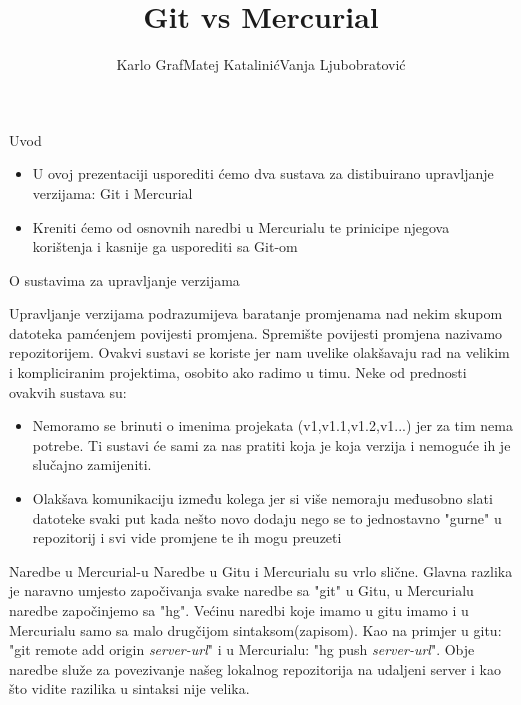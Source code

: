 \documentclass{beamer}
\title[]{Git vs Mercurial}
\author{Karlo Graf\newline Matej Katalinić\newline Vanja Ljubobratović}
\institute{Tehnički Fakultet, Sveučilište u Rijeci}
\begin{document}
\begin{frame}
  \titlepage
\end{frame}


\begin{frame}{Uvod}

\begin{itemize}
  \item U ovoj prezentaciji usporediti ćemo dva sustava za distibuirano upravljanje verzijama: Git i Mercurial
  \item Kreniti ćemo od osnovnih naredbi u Mercurialu te prinicipe njegova korištenja i kasnije ga usporediti sa Git-om
\end{itemize}

\vskip 1cm


\end{frame}

\begin{frame}{O sustavima za upravljanje verzijama}

Upravljanje verzijama podrazumijeva baratanje promjenama nad nekim skupom datoteka pamćenjem povijesti promjena. Spremište povijesti promjena nazivamo repozitorijem. Ovakvi sustavi se koriste jer nam uvelike olakšavaju rad na velikim i kompliciranim projektima, osobito ako radimo u timu. Neke od prednosti ovakvih sustava su:
\begin{itemize}
  \item Nemoramo se brinuti o imenima projekata (v1,v1.1,v1.2,v1...) jer za tim nema potrebe. Ti sustavi će sami za nas pratiti koja je koja verzija i nemoguće ih je slučajno zamijeniti.
  \item Olakšava komunikaciju između kolega jer si više nemoraju međusobno slati datoteke svaki put kada nešto novo dodaju nego se to jednostavno "gurne" u repozitorij i svi vide promjene te ih mogu preuzeti
\end{itemize}
\end{frame}
\begin{frame}{Naredbe u Mercurial-u}
Naredbe u Gitu i Mercurialu su vrlo slične. Glavna razlika je naravno umjesto započivanja svake naredbe sa "git" u Gitu, u Mercurialu naredbe započinjemo sa "hg". Većinu naredbi koje imamo u gitu imamo i u Mercurialu samo sa malo drugčijom sintaksom(zapisom). Kao na primjer u gitu: "git remote add origin\textit{  server-url}" i u Mercurialu: "hg push \textit{server-url}". Obje naredbe služe za povezivanje našeg lokalnog repozitorija na udaljeni server i kao što vidite razilika u sintaksi nije velika. 

\end{frame}
\end{document}

